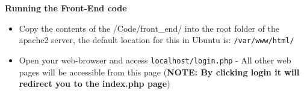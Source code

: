 \documentclass[10pt, a4paper, onecolumn]{scrartcl}
\begin{document}
	\textbf{Running the Front-End code} 
	
	
		\begin{itemize}[noitemsep]
			\item 	Copy the contents of the /Code/front\_end/ into the root folder of the
			apache2 server, the default location for this in Ubuntu is: \texttt{/var/www/html/}
			\item 	Open your web-browser and access \texttt{localhost/login.php} - All
			other web pages will be accessible from this page (\textbf{NOTE: By clicking login it will redirect you to the index.php page})
		\end{itemize}
		

	

	
\end{document}
